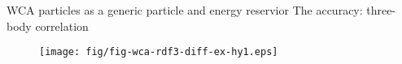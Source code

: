 \documentclass[]{beamer}
\newcommand{\redc}[1]{{\color{red} #1}}
\newcommand{\bluec}[1]{{\color{blue} #1}}
\newcommand{\blackc}[1]{{\color{black} #1}}
\newcommand{\vect}[1]{\textbf{\textit{#1}}}
\newcommand{\corr}{C^{(3)}}
\newcommand{\AT}{{\textrm{{AT}}}}
\newcommand{\EX}{{\textrm{AT}}}
\newcommand{\CG}{{\textrm{CG}}}
\newcommand{\HY}{{\textrm{HY}}}
\newcommand{\tickYes}{\checkmark}
\newcommand{\tickNo}{\hspace{1pt}\ding{55}}
\begin{document}
\begin{frame}{WCA particles as a generic particle and energy reservior}
  {The accuracy: three-body correlation}
  \begin{figure}
    \centering 
    \texttt{[image: fig/fig-wca-rdf3-diff-ex-hy1.eps]}
  \end{figure}
\end{frame}




\end{document}
